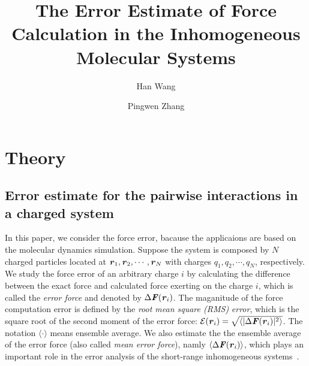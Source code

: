 \documentclass[aps,pre,preprint]{revtex4}
\renewcommand{\v}[1]{\textbf{\textit{#1}}}
\begin{document}
\title{The Error Estimate of Force Calculation in the Inhomogeneous Molecular Systems}
\author{Han Wang}
\author{Pingwen Zhang}

\begin{abstract}
\end{abstract}

\maketitle

\section{Theory}

\subsection{Error estimate for
  the pairwise interactions in a charged system}

In this paper, we consider the force error, bacause the applicaions
are based on the molecular dynamics simulation.  Suppose the system is
composed by $N$ charged particles located at $\v r_1, \v r_2, \cdots,
\v r_N$ with charges $q_1, q_2, \cdots, q_N$, respectively.  We study
the force error of an arbitrary charge $i$ by calculating the
difference between the exact force and calculated force exerting on
the charge $i$, which is called the \emph{error force}
\cite{wang2012} and denoted by $\Delta \v F(\v r_i)$.
The maganitude of the force computation error 
is defined by the \emph{root mean square (RMS)} \emph{error}, which is
the square root of the second moment of the error force: $\mathcal
E(\v r_i) = \sqrt{\langle\vert\Delta\v F(\v r_i)\vert^2\rangle}$.  The
notation $\langle\cdot\rangle$ means ensemble average.  We also
estimate the the ensemble average of the error force (also called
\emph{mean error force}), namly $\langle\Delta\v F(\v r_i)\rangle$,
which plays an important role in the error analysis of the
short-range inhomogeneous systems~\cite{wang2012}.
\end{document}
